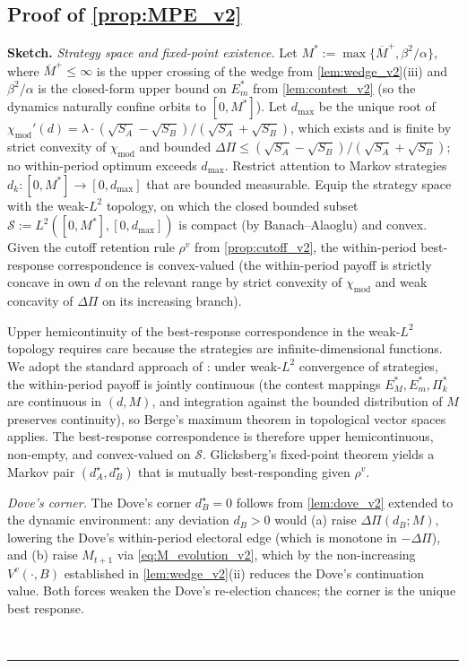 \documentclass[11pt,twoside]{extarticle}
\newenvironment{proof}[1][Proof]{\noindent \textbf{#1.} }{\ \rule{0.5em}{0.5em}}
\begin{document}
\subsection*{Proof of \autoref{prop:MPE_v2}} \label{app:proof:MPE_v2}

\begin{proof}[Sketch]
\textit{Strategy space and fixed-point existence.} Let $M^* := \max\{\overline M^+, \beta^2/\alpha\}$,
where $\overline M^+ \le \infty$ is the upper crossing of the wedge from
\autoref{lem:wedge_v2}(iii) and $\beta^2/\alpha$ is the closed-form
upper bound on $E_m^*$ from \autoref{lem:contest_v2} (so the dynamics
naturally confine orbits to $[0, M^*]$). Let $d_{\max}$ be the unique
root of $\chi_{\mathrm{mod}}'(d) = \lambda \cdot (\sqrt{S_A}-\sqrt{S_B})/(\sqrt{S_A}+\sqrt{S_B})$,
which exists and is finite by strict convexity of $\chi_{\mathrm{mod}}$
and bounded $\Delta\Pi \le (\sqrt{S_A}-\sqrt{S_B})/(\sqrt{S_A}+\sqrt{S_B})$;
no within-period optimum exceeds $d_{\max}$. Restrict attention to
Markov strategies $d_k : [0, M^*] \to [0, d_{\max}]$ that are bounded
measurable. Equip the strategy space with the weak-$L^2$ topology, on
which the closed bounded subset
$\mathcal{S} := L^2([0, M^*], [0, d_{\max}])$ is compact (by
Banach–Alaoglu) and convex. Given the cutoff retention rule
$\rho^v$ from \autoref{prop:cutoff_v2}, the within-period best-response
correspondence is convex-valued (the within-period payoff is strictly
concave in own $d$ on the relevant range by strict convexity of
$\chi_{\mathrm{mod}}$ and weak concavity of $\Delta\Pi$ on its
increasing branch).

Upper hemicontinuity of the best-response correspondence in the
weak-$L^2$ topology requires care because the strategies are
infinite-dimensional functions. We adopt the standard approach of
\citet[Theorem~17.31]{aliprantisInfiniteDimensionalAnalysis2006}: under
weak-$L^2$ convergence of strategies, the within-period payoff is
jointly continuous (the contest mappings $E_M^*, E_m^*, \Pi_k^*$ are
continuous in $(d, M)$, and integration against the bounded
distribution of $M$ preserves continuity), so Berge's maximum theorem
in topological vector spaces applies. The best-response correspondence
is therefore upper hemicontinuous, non-empty, and convex-valued on
$\mathcal{S}$. Glicksberg's fixed-point theorem yields a Markov pair
$(d_A^\star, d_B^\star)$ that is mutually best-responding given
$\rho^v$.

\textit{Dove's corner.} The Dove's corner $d_B^\star = 0$ follows from
\autoref{lem:dove_v2} extended to the dynamic environment: any deviation
$d_B > 0$ would (a) raise $\Delta\Pi(d_B; M)$, lowering the Dove's
within-period electoral edge (which is monotone in $-\Delta\Pi$), and
(b) raise $M_{t+1}$ via \autoref{eq:M_evolution_v2}, which by the
non-increasing $V^v(\cdot, B)$ established in \autoref{lem:wedge_v2}(ii)
reduces the Dove's continuation value. Both forces weaken the Dove's
re-election chances; the corner is the unique best response.


\end{proof}
\end{document}
